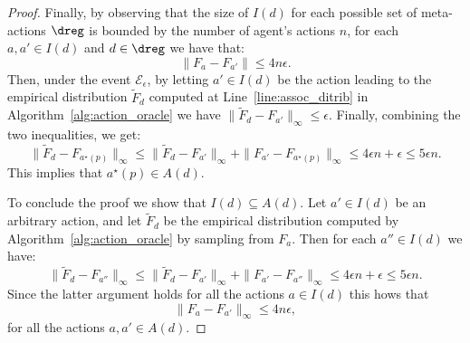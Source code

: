 \begin{proof}
	Finally, by observing that the size of $I(d)$ for each possible set of meta-actions $\dreg$ is bounded by the number of agent's actions $n$, for each $a,a' \in I(d)$ and $d \in \dreg$ we have that:
	\begin{equation}\label{eq:rec_finale}
		\lVert F_{a}- F_{a'} \rVert\le 4n\epsilon.
	\end{equation}
	Then, under the event $\mathcal{E}_\epsilon$, by letting $a' \in I(d)$ be the action leading to the empirical distribution $\widetilde F_d$ computed at Line~\ref{line:assoc_ditrib} in Algorithm~\ref{alg:action_oracle} we have $ \| \widetilde F_d -F_{ a' } \|_\infty\le \epsilon$.
	Finally, combining the two inequalities, we get:
	\begin{equation*}
		\|\widetilde F_{d}- F_{a^\star(p)}\|_{\infty} \leq \|\widetilde F_d- F_{ a' } \|_{\infty} + \|F_{ a ' }- F_{a^\star(p)} \|_{\infty}  \le 4\epsilon n+ \epsilon\le 5\epsilon n.
	\end{equation*}
	This implies that $a^\star(p) \in A(d)$.
	
	To conclude the proof we show that $I(d)\subseteq A(d)$. Let $a' \in I(d)$ be an arbitrary action, and let $\widetilde F_d$ be the empirical distribution computed by Algorithm~\ref{alg:action_oracle} by sampling from $F_a$. Then for each $a'' \in I(d)$ we have:
	\begin{equation*}
		\|\widetilde F_{d}- F_{a''}\|_{\infty} \leq \|\widetilde F_d- F_{ a' } \|_{\infty} + \|F_{ a ' }- F_{a''} \|_{\infty}  \le 4\epsilon n+ \epsilon\le 5\epsilon n.
	\end{equation*}
	Since the latter argument holds for all the actions $a \in I(d)$ this hows that 
		\begin{equation}
		\lVert F_{a}- F_{a'} \rVert_{\infty} \le 4n\epsilon,
	\end{equation}
	for all the actions $a,a' \in A(d)$.
	\end{proof}

